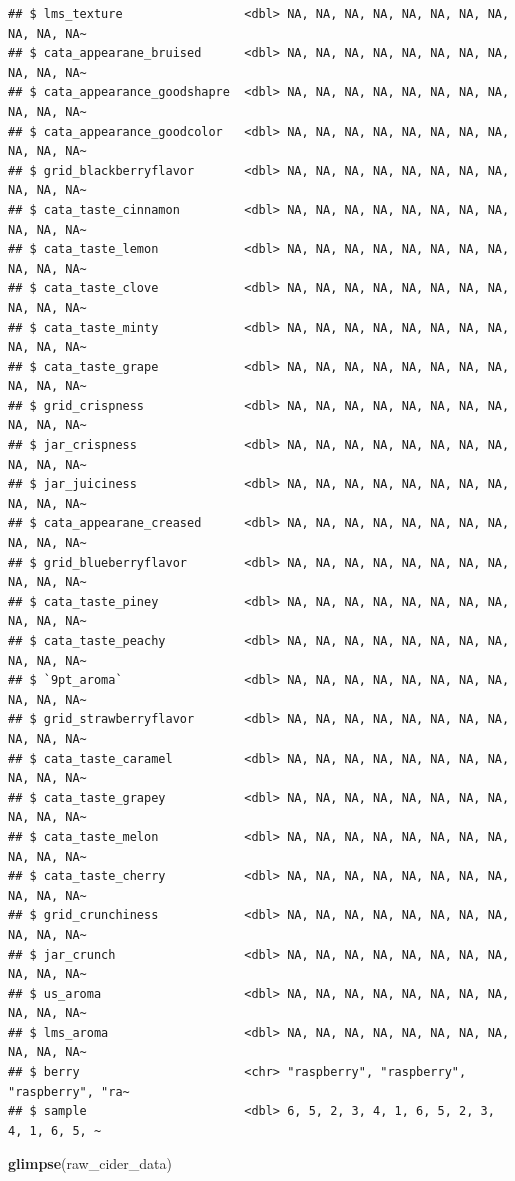\documentclass[
]{book}
\newenvironment{Shaded}{\begin{snugshade}}{\end{snugshade}}
\newcommand{\FunctionTok}[1]{\textcolor[rgb]{0.13,0.29,0.53}{\textbf{#1}}}
\newcommand{\NormalTok}[1]{#1}
\begin{document}
\begin{verbatim}
## $ lms_texture                 <dbl> NA, NA, NA, NA, NA, NA, NA, NA, NA, NA, NA~
## $ cata_appearane_bruised      <dbl> NA, NA, NA, NA, NA, NA, NA, NA, NA, NA, NA~
## $ cata_appearance_goodshapre  <dbl> NA, NA, NA, NA, NA, NA, NA, NA, NA, NA, NA~
## $ cata_appearance_goodcolor   <dbl> NA, NA, NA, NA, NA, NA, NA, NA, NA, NA, NA~
## $ grid_blackberryflavor       <dbl> NA, NA, NA, NA, NA, NA, NA, NA, NA, NA, NA~
## $ cata_taste_cinnamon         <dbl> NA, NA, NA, NA, NA, NA, NA, NA, NA, NA, NA~
## $ cata_taste_lemon            <dbl> NA, NA, NA, NA, NA, NA, NA, NA, NA, NA, NA~
## $ cata_taste_clove            <dbl> NA, NA, NA, NA, NA, NA, NA, NA, NA, NA, NA~
## $ cata_taste_minty            <dbl> NA, NA, NA, NA, NA, NA, NA, NA, NA, NA, NA~
## $ cata_taste_grape            <dbl> NA, NA, NA, NA, NA, NA, NA, NA, NA, NA, NA~
## $ grid_crispness              <dbl> NA, NA, NA, NA, NA, NA, NA, NA, NA, NA, NA~
## $ jar_crispness               <dbl> NA, NA, NA, NA, NA, NA, NA, NA, NA, NA, NA~
## $ jar_juiciness               <dbl> NA, NA, NA, NA, NA, NA, NA, NA, NA, NA, NA~
## $ cata_appearane_creased      <dbl> NA, NA, NA, NA, NA, NA, NA, NA, NA, NA, NA~
## $ grid_blueberryflavor        <dbl> NA, NA, NA, NA, NA, NA, NA, NA, NA, NA, NA~
## $ cata_taste_piney            <dbl> NA, NA, NA, NA, NA, NA, NA, NA, NA, NA, NA~
## $ cata_taste_peachy           <dbl> NA, NA, NA, NA, NA, NA, NA, NA, NA, NA, NA~
## $ `9pt_aroma`                 <dbl> NA, NA, NA, NA, NA, NA, NA, NA, NA, NA, NA~
## $ grid_strawberryflavor       <dbl> NA, NA, NA, NA, NA, NA, NA, NA, NA, NA, NA~
## $ cata_taste_caramel          <dbl> NA, NA, NA, NA, NA, NA, NA, NA, NA, NA, NA~
## $ cata_taste_grapey           <dbl> NA, NA, NA, NA, NA, NA, NA, NA, NA, NA, NA~
## $ cata_taste_melon            <dbl> NA, NA, NA, NA, NA, NA, NA, NA, NA, NA, NA~
## $ cata_taste_cherry           <dbl> NA, NA, NA, NA, NA, NA, NA, NA, NA, NA, NA~
## $ grid_crunchiness            <dbl> NA, NA, NA, NA, NA, NA, NA, NA, NA, NA, NA~
## $ jar_crunch                  <dbl> NA, NA, NA, NA, NA, NA, NA, NA, NA, NA, NA~
## $ us_aroma                    <dbl> NA, NA, NA, NA, NA, NA, NA, NA, NA, NA, NA~
## $ lms_aroma                   <dbl> NA, NA, NA, NA, NA, NA, NA, NA, NA, NA, NA~
## $ berry                       <chr> "raspberry", "raspberry", "raspberry", "ra~
## $ sample                      <dbl> 6, 5, 2, 3, 4, 1, 6, 5, 2, 3, 4, 1, 6, 5, ~
\end{verbatim}

\begin{Shaded}
\begin{Highlighting}[]
\FunctionTok{glimpse}\NormalTok{(raw\_cider\_data)}
\end{Highlighting}
\end{Shaded}
\end{document}
